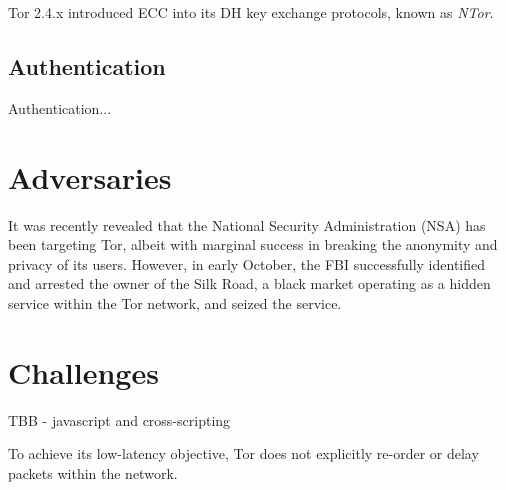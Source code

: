 \documentclass[journal]{IEEEtran}
\begin{document}
Tor 2.4.x introduced ECC into its DH key exchange protocols, known as \textit{NTor}.

\subsection{Authentication}

Authentication...

\section{Adversaries}

It was recently revealed that the National Security Administration (NSA) has been targeting Tor, albeit with marginal success in breaking the anonymity and privacy of its users. However, in early October, the FBI successfully identified and arrested the owner of the Silk Road, a black market operating as a hidden service within the Tor network, and seized the service.

\section{Challenges}

TBB - javascript and cross-scripting

To achieve its low-latency objective, Tor does not explicitly re-order or delay packets within the network.\cite{McCoy2008}
\end{document}
